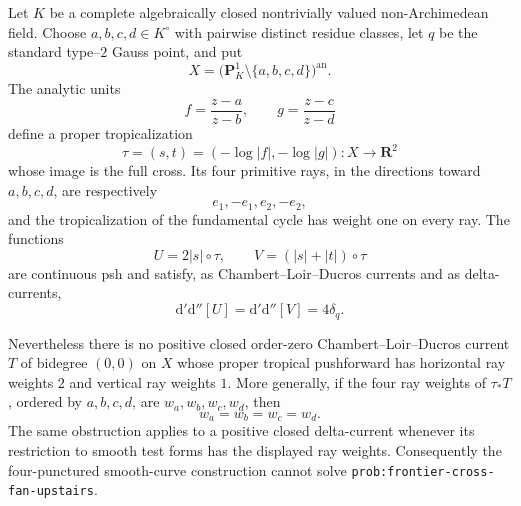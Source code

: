\begin{proposition}
Let $K$ be a complete algebraically closed nontrivially valued
non-Archimedean field.  Choose $a,b,c,d\in K^\circ$ with pairwise distinct
residue classes, let $q$ be the standard type--$2$ Gauss point, and put
\[
 X=\bigl(\mathbf P^1_K\setminus\{a,b,c,d\}\bigr)^{\mathrm{an}}.
\]
The analytic units
\[
 f=\frac{z-a}{z-b},\qquad g=\frac{z-c}{z-d}
\]
define a proper tropicalization
\[
 \tau=(s,t)=(-\log|f|,-\log|g|):X\longrightarrow\mathbf R^2
\]
whose image is the full cross.  Its four primitive rays, in the directions
toward $a,b,c,d$, are respectively
\[
 e_1,-e_1,e_2,-e_2,
\]
and the tropicalization of the fundamental cycle has weight one on every
ray.  The functions
\[
 U=2|s|\circ\tau,\qquad V=(|s|+|t|)\circ\tau
\]
are continuous psh and satisfy, as Chambert--Loir--Ducros currents and as
delta-currents,
\[
                 \mathrm d'\mathrm d''[U]
                 =\mathrm d'\mathrm d''[V]=4\delta_q.
\]

Nevertheless there is no positive closed order-zero Chambert--Loir--Ducros
current $T$ of bidegree $(0,0)$ on $X$ whose proper tropical pushforward has
horizontal ray weights $2$ and vertical ray weights $1$.  More generally,
if the four ray weights of $\tau_*T$, ordered by $a,b,c,d$, are
$w_a,w_b,w_c,w_d$, then
\[
                         w_a=w_b=w_c=w_d.
\]
The same obstruction applies to a positive closed delta-current whenever
its restriction to smooth test forms has the displayed ray weights.
Consequently the four-punctured smooth-curve construction cannot solve
\textup{\texttt{prob:frontier-cross-fan-upstairs}}.
\end{proposition}
